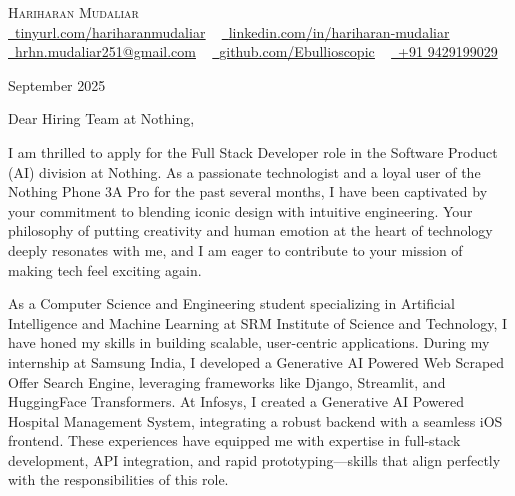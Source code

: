 \documentclass[letterpaper,11pt]{article}
\begin{document}
\begin{center}
    {\Huge \scshape Hariharan Mudaliar} \\ \vspace{1pt}
    \href{https://tinyurl.com/hariharanmudaliar}{\raisebox{-0.2\height}\faLink\ \underline{tinyurl.com/hariharanmudaliar}} ~
    \href{https://linkedin.com/in/hariharan-mudaliar}{\raisebox{-0.2\height}\faLinkedin\ \underline{linkedin.com/in/hariharan-mudaliar}} ~
    \href{mailto:hrhn.mudaliar251@gmail.com}{\raisebox{-0.2\height}\faEnvelope\ \underline{hrhn.mudaliar251@gmail.com}} ~
    \href{https://github.com/Ebullioscopic}{\raisebox{-0.2\height}\faGithub\ \underline{github.com/Ebullioscopic}} ~
    \href{tel:+919429199029}{\raisebox{-0.2\height}\faPhone\ +91 9429199029}
\end{center}

\vspace{20pt}

 September 2025

\vspace{20pt}

\noindent Dear Hiring Team at Nothing,

\vspace{10pt}

I am thrilled to apply for the Full Stack Developer role in the Software Product (AI) division at Nothing. As a passionate technologist and a loyal user of the Nothing Phone 3A Pro for the past several months, I have been captivated by your commitment to blending iconic design with intuitive engineering. Your philosophy of putting creativity and human emotion at the heart of technology deeply resonates with me, and I am eager to contribute to your mission of making tech feel exciting again.

As a Computer Science and Engineering student specializing in Artificial Intelligence and Machine Learning at SRM Institute of Science and Technology, I have honed my skills in building scalable, user-centric applications. During my internship at Samsung India, I developed a Generative AI Powered Web Scraped Offer Search Engine, leveraging frameworks like Django, Streamlit, and HuggingFace Transformers. At Infosys, I created a Generative AI Powered Hospital Management System, integrating a robust backend with a seamless iOS frontend. These experiences have equipped me with expertise in full-stack development, API integration, and rapid prototyping—skills that align perfectly with the responsibilities of this role.
\end{document}
